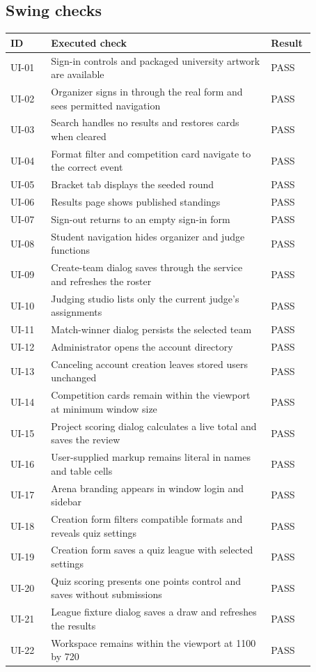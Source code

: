 \subsection*{Swing checks}
\small\begin{longtable}{p{0.12\linewidth}p{0.65\linewidth}p{0.1\linewidth}}\toprule ID & Executed check & Result\\\midrule\endhead
UI-01 & Sign-in controls and packaged university artwork are available & PASS\\
UI-02 & Organizer signs in through the real form and sees permitted navigation & PASS\\
UI-03 & Search handles no results and restores cards when cleared & PASS\\
UI-04 & Format filter and competition card navigate to the correct event & PASS\\
UI-05 & Bracket tab displays the seeded round & PASS\\
UI-06 & Results page shows published standings & PASS\\
UI-07 & Sign-out returns to an empty sign-in form & PASS\\
UI-08 & Student navigation hides organizer and judge functions & PASS\\
UI-09 & Create-team dialog saves through the service and refreshes the roster & PASS\\
UI-10 & Judging studio lists only the current judge's assignments & PASS\\
UI-11 & Match-winner dialog persists the selected team & PASS\\
UI-12 & Administrator opens the account directory & PASS\\
UI-13 & Canceling account creation leaves stored users unchanged & PASS\\
UI-14 & Competition cards remain within the viewport at minimum window size & PASS\\
UI-15 & Project scoring dialog calculates a live total and saves the review & PASS\\
UI-16 & User-supplied markup remains literal in names and table cells & PASS\\
UI-17 & Arena branding appears in window login and sidebar & PASS\\
UI-18 & Creation form filters compatible formats and reveals quiz settings & PASS\\
UI-19 & Creation form saves a quiz league with selected settings & PASS\\
UI-20 & Quiz scoring presents one points control and saves without submissions & PASS\\
UI-21 & League fixture dialog saves a draw and refreshes the results & PASS\\
UI-22 & Workspace remains within the viewport at 1100 by 720 & PASS\\
\bottomrule\end{longtable}\normalsize